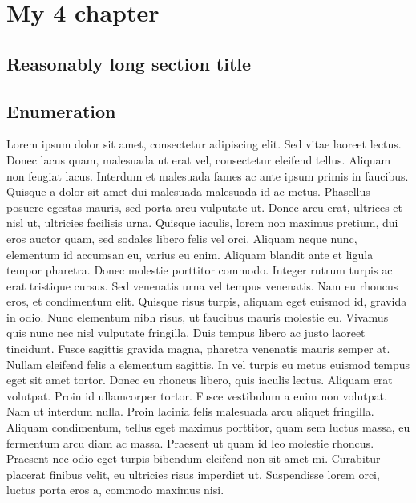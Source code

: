 
\chapter{My 4 chapter}

\ifpdf
    \graphicspath{{Chapter4/Figs/Raster/}{Chapter4/Figs/PDF/}{Chapter4/Figs/}}
\else
    \graphicspath{{Chapter4/Figs/Vector/}{Chapter4/Figs/}}
\fi


\section[Short title]{Reasonably long section title}



\section*{Enumeration}
Lorem ipsum dolor sit amet, consectetur adipiscing elit. Sed vitae laoreet lectus.
Donec lacus quam, malesuada ut erat vel, consectetur eleifend tellus. Aliquam non
feugiat lacus. Interdum et malesuada fames ac ante ipsum primis in faucibus.
Quisque a dolor sit amet dui malesuada malesuada id ac metus. Phasellus posuere
egestas mauris, sed porta arcu vulputate ut. Donec arcu erat, ultrices et nisl ut,
ultricies facilisis urna. Quisque iaculis, lorem non maximus pretium, dui eros
auctor quam, sed sodales libero felis vel orci. Aliquam neque nunc, elementum id
accumsan eu, varius eu enim. Aliquam blandit ante et ligula tempor pharetra.
Donec molestie porttitor commodo. Integer rutrum turpis ac erat tristique cursus.
Sed venenatis urna vel tempus venenatis. Nam eu rhoncus eros, et condimentum elit.
Quisque risus turpis, aliquam eget euismod id, gravida in odio. Nunc elementum
nibh risus, ut faucibus mauris molestie eu.
Vivamus quis nunc nec nisl vulputate fringilla. Duis tempus libero ac justo
laoreet tincidunt. Fusce sagittis gravida magna, pharetra venenatis mauris
semper at. Nullam eleifend felis a elementum sagittis. In vel turpis eu metus
euismod tempus eget sit amet tortor. Donec eu rhoncus libero, quis iaculis lectus.
Aliquam erat volutpat. Proin id ullamcorper tortor. Fusce vestibulum a enim non
volutpat. Nam ut interdum nulla. Proin lacinia felis malesuada arcu aliquet fringilla.
Aliquam condimentum, tellus eget maximus porttitor, quam sem luctus massa,
eu fermentum arcu diam ac massa. Praesent ut quam id leo molestie rhoncus.
Praesent nec odio eget turpis bibendum eleifend non sit amet mi. Curabitur placerat
finibus velit, eu ultricies risus imperdiet ut. Suspendisse lorem orci, luctus
porta eros a, commodo maximus nisi.

